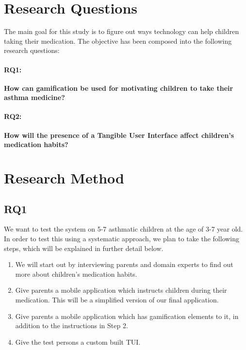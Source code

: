 \section{Research Questions}
\label{sec:researchquestions}
The main goal for this study is to figure out ways technology can help children taking their medication. The objective has been composed into the following research questions: 

\paragraph{RQ1:}
\textbf{How can gamification be used for motivating children to take their asthma medicine?}


\paragraph{RQ2:}
\textbf{How will the presence of a Tangible User Interface affect children's medication habits?}


\section{Research Method}
\label{sec:researchmethod}


\subsection{RQ1}
\label{sec:RQ2-methodology}
We want to test the system on 5-7 asthmatic children at the age of 3-7 year old. In order to test this using a systematic approach, we plan to take the following steps, which will be explained in further detail below. 

\begin{enumerate}
  \item We will start out by interviewing parents and domain experts to find out more about children's medication habits. 
  \item Give parents a mobile application which instructs children during their medication. This will be a simplified version of our final application.  
  \item Give parents a mobile application which has gamification elements to it, in addition to the instructions in Step 2. 
  \item Give the test persons a custom built TUI. 
\end{enumerate}
 

